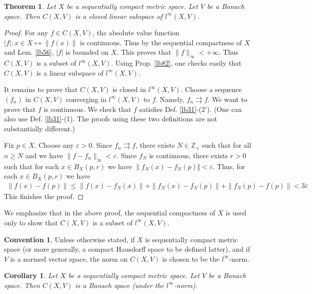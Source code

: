 \documentclass[12pt,b5paper,notitlepage]{article}
\theoremstyle{definition}
\newtheorem{cv}[df]{Convention}
\theoremstyle{plain}
\newtheorem{thm}[df]{Theorem}
\newtheorem{co}[df]{Corollary}
\newcommand{\Zbb}{\mathbb Z}
\newcommand{\eps}{\varepsilon}
\numberwithin{equation}{section}
\begin{document}
\begin{thm}\label{lb87}
Let $X$ be a sequentially compact metric space. Let $V$ be a Banach space. Then $C(X,V)$ is a closed linear subspace of $l^\infty(X,V)$.
\end{thm}



\begin{proof}
For any $f\in C(X,V)$, the absolute value function $|f|:x\in X\mapsto\lVert f(x)\lVert$ is continuous. Thus by the sequential compactness of $X$ and Lem. \ref{lb56}, $|f|$ is bounded on $X$. This proves that $\lVert f\lVert_\infty<+\infty$. Thus $C(X,V)$ is a subset of $l^\infty(X,V)$. Using Prop. \ref{lb82}, one checks easily that $C(X,V)$ is a linear subspace of $l^\infty(X,V)$.

It remains to prove that $C(X,V)$ is closed in $l^\infty(X,V)$. Choose a sequence $(f_n)$ in $C(X,V)$ converging in $l^\infty(X,V)$ to $f$. Namely, $f_n\rightrightarrows f$. We want to prove that $f$ is continuous. We check that $f$ satisfies Def. \ref{lb31}-(2'). (One can also use Def. \ref{lb31}-(1). The proofs using these two definitions are not substantially different.)

Fix $p\in X$. Choose any $\eps>0$. Since $f_n\rightrightarrows f$, there exists $N\in\Zbb_+$ such that for all $n\geq N$ and we have $\lVert f-f_n\lVert_\infty<\eps$. Since $f_N$ is continuous, there exists $r>0$ such that for each $x\in B_X(p,r)$ we have $\lVert f_N(x)-f_N(p)\Vert<\eps$. Thus, for each $x\in B_X(p,r)$ we have
\begin{align*}
\lVert f(x)-f(p)\lVert\leq \lVert f(x)-f_N(x)\lVert +\lVert f_N(x)-f_N(p)\lVert+\lVert f_N(p)-f(p)\lVert<3\eps
\end{align*}
This finishes the proof.
\end{proof}

We emphasize that in the above proof, the sequential compactness of $X$ is used only to show that $C(X,V)$ is a subset of $l^\infty(X,V)$.



\begin{cv}\label{lb88}
Unless otherwise stated, if $X$ is sequentially compact metric space (or more generally, a compact Hausdorff space to be defined latter), and if $V$ is a normed vector space, the norm on $C(X,V)$ is chosen to be the $l^\infty$-norm.
\end{cv}


\begin{co}
Let $X$ be a sequentially compact metric space. Let $V$ be a Banach space. Then  $C(X,V)$ is a Banach space (under the $l^\infty$-norm).
\end{co}
\end{document}
